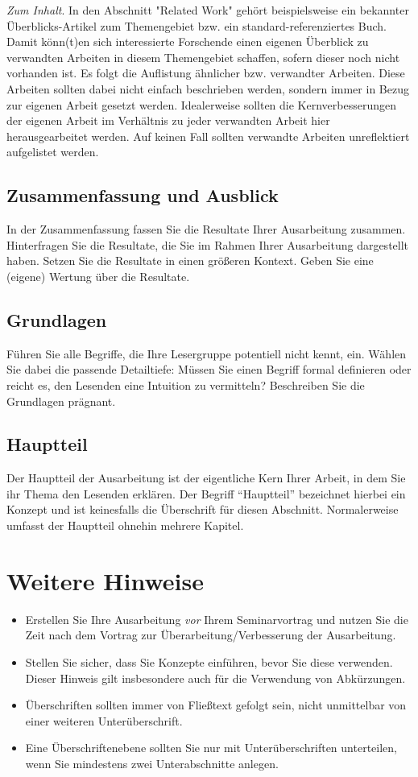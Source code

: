 \noindent
\emph{Zum Inhalt}.
In den Abschnitt "Related Work" gehört beispielsweise ein bekannter Überblicks-Artikel zum
Themengebiet bzw. ein standard-referenziertes Buch.
Damit könn(t)en sich interessierte Forschende einen eigenen Überblick zu verwandten Arbeiten in
diesem Themengebiet schaffen, sofern dieser noch nicht vorhanden ist.
Es folgt die Auflistung ähnlicher bzw. verwandter Arbeiten.
Diese Arbeiten sollten dabei nicht einfach beschrieben werden, sondern immer in Bezug zur eigenen
Arbeit gesetzt werden.
Idealerweise sollten die Kernverbesserungen der eigenen Arbeit im Verhältnis zu jeder verwandten
Arbeit hier herausgearbeitet werden.
Auf keinen Fall sollten verwandte Arbeiten unreflektiert aufgelistet werden.

\subsection{Zusammenfassung und Ausblick}
In der Zusammenfassung fassen Sie die Resultate Ihrer Ausarbeitung zusammen. Hinterfragen Sie die
Resultate, die Sie im Rahmen Ihrer Ausarbeitung dargestellt haben. Setzen Sie die Resultate in einen
größeren Kontext. Geben Sie eine (eigene) Wertung über die Resultate.



\subsection{Grundlagen}
Führen Sie alle Begriffe, die Ihre Lesergruppe potentiell nicht kennt, ein. Wählen Sie dabei die
passende Detailtiefe: Müssen Sie einen Begriff formal definieren oder reicht es, den Lesenden eine
Intuition zu vermitteln? Beschreiben Sie die Grundlagen prägnant.

\subsection{Hauptteil}
Der Hauptteil der Ausarbeitung ist der eigentliche Kern Ihrer Arbeit, in dem Sie ihr Thema den Lesenden
erklären. Der Begriff ``Hauptteil'' bezeichnet hierbei ein Konzept und ist keinesfalls die
Überschrift für diesen Abschnitt. Normalerweise umfasst der Hauptteil ohnehin mehrere Kapitel.

\section{Weitere Hinweise}
\begin{itemize}
\item Erstellen Sie Ihre Ausarbeitung \emph{vor} Ihrem Seminarvortrag und nutzen Sie die Zeit nach
  dem Vortrag zur Überarbeitung/Verbesserung der Ausarbeitung.
\item Stellen Sie sicher, dass Sie Konzepte einführen, bevor Sie diese verwenden. Dieser Hinweis
  gilt insbesondere auch für die Verwendung von Abkürzungen.
\item Überschriften sollten immer von Fließtext gefolgt sein, nicht unmittelbar von einer weiteren
  Unterüberschrift.
\item Eine Überschriftenebene sollten Sie nur mit Unterüberschriften unterteilen, wenn Sie
  mindestens zwei Unterabschnitte anlegen.
\end{itemize}
